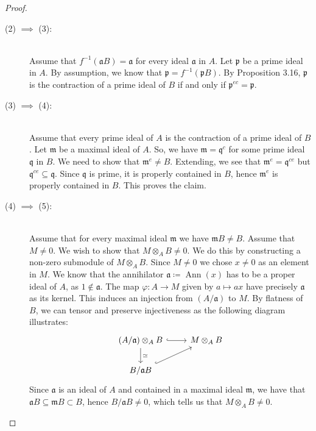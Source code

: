 \documentclass{article}
\newcommand{\m}{\mathfrak{m}}
\newcommand{\p}{\mathfrak{p}}
\newcommand{\q}{\mathfrak{q}}
\newcommand{\tensor}{\otimes}
\renewcommand{\a}{\mathfrak{a}}
\DeclareMathOperator{\Ann}{Ann}
\begin{document}
\begin{proof}
\begin{description}
            \item[(2) $\implies$ (3):]\hfill \\
                Assume that $f^{-1}(\a B) = \a$ for every ideal $\a$ in $A$.
                Let $\p$ be a prime ideal in $A$. By assumption, we know that
                $\p = f^{-1}(\p B)$. By Proposition 3.16, $\p$ is the
                contraction of a prime ideal of $B$ if and only if $\p^{ec} =
                \p$.

            \item[(3) $\implies$ (4):]\hfill \\
                Assume that every prime ideal of $A$ is the contraction of a
                prime ideal of $B$. Let $\m$ be a maximal ideal of $A$. So, we
                have $\m = \q^c$ for some prime ideal $\q$ in $B$. We need to
                show that $\m^e \neq B$. Extending, we see that $\m^e =
                \q^{ce}$ but $\q^{ce} \subseteq \q$. Since $\q$ is prime, it is
                properly contained in $B$, hence $\m^e$ is properly contained
                in $B$. This proves the claim.

            \item [(4) $\implies$ (5):]\hfill \\
                Assume that for every maximal ideal $\m$ we have $\m B \neq B$.
                Assume that $M \neq 0$. We wish to show that $M \tensor_A B
                \neq 0$. We do this by constructing a non-zero submodule of $M
                \tensor_A B$. Since $M \neq 0$ we chose $x \neq 0$ as an
                element in $M$. We know that the annihilator $\a \coloneqq
                \Ann(x)$ has to be a proper ideal of $A$, as $1 \notin \a$.
                The map $\varphi\colon A \to M$ given by $a \mapsto ax$ have
                precisely $\a$ as its kernel. This induces an injection from
                $(A / \a)$ to $M$. By flatness of $B$, we can tensor and
                preserve injectiveness as the following diagram illustrates:
                \begin{equation}
                    \notag
                    \begin{tikzcd}
                        (A / \a) \tensor_A B \ar[r, hookrightarrow] \ar[d, "\simeq"] & M \tensor_A B \\
                        B / \a B \ar[ur, hookrightarrow]
                    \end{tikzcd}
                \end{equation}
                Since $\a$ is an ideal of $A$ and contained in a maximal ideal
                $\m$, we have that $\a B \subseteq \m B \subset B$, hence $B /
                \a B \neq 0$, which tells us that $M \tensor_A B \neq 0$.


\end{description}
\end{proof}
\end{document}
